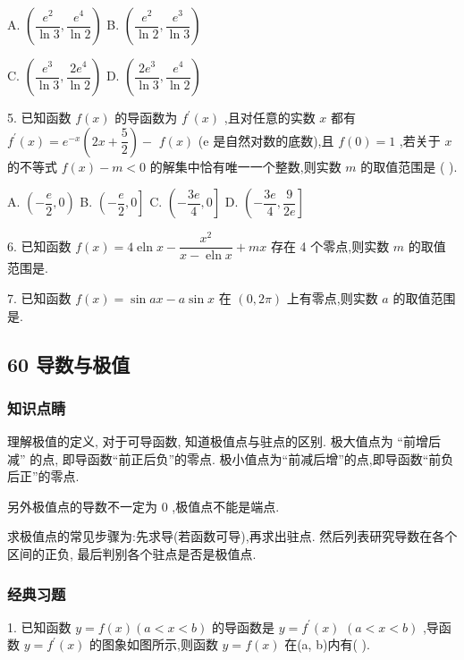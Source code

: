 A. $\left( {\dfrac{{{e}}^{2}}{\ln 3},\dfrac{{{e}}^{4}}{\ln 2}}\right)$ B. $\left( {\dfrac{{{e}}^{2}}{\ln 2},\dfrac{{{e}}^{3}}{\ln 3}}\right)$

C. $\left( {\dfrac{{{e}}^{3}}{\ln 3},\dfrac{2{{e}}^{4}}{\ln 2}}\right)$ D. $\left( {\dfrac{2{{e}}^{3}}{\ln 3},\dfrac{{{e}}^{4}}{\ln 2}}\right)$

5. 已知函数 $f\left( x\right)$ 的导函数为 ${f}^{\prime }\left( x\right)$ ,且对任意的实数 $x$ 都有 ${f}^{\prime }\left( x\right)  = {{e}}^{-x}\left( {{2x} + \dfrac{5}{2}}\right)  -$  $f\left( x\right)$ (e 是自然对数的底数),且 $f\left( 0\right)  = 1$ ,若关于 $x$ 的不等式 $f\left( x\right)  - m < 0$ 的解集中恰有唯一一个整数,则实数 $m$ 的取值范围是 (   ).

A. $\left( {-\dfrac{{e}}{2},0}\right)$ B. $\left( {-\dfrac{{e}}{2},0}\right\rbrack$ C. $\left( {-\dfrac{3{e}}{4},0}\right\rbrack$ D. $\left( {-\dfrac{3{e}}{4},\dfrac{9}{2{e}}}\right\rbrack$

6. 已知函数 $f\left( x\right)  = 4\operatorname{eln}x - \dfrac{{x}^{2}}{x - \operatorname{eln}x} + {mx}$ 存在 4 个零点,则实数 $m$ 的取值范围是\blkda{}.

7. 已知函数 $f\left( x\right)  = \sin {ax} - a\sin x$ 在 $\left( {0,{2\pi }}\right)$ 上有零点,则实数 $a$ 的取值范围是\blkda{}.

\subsection*{60 导数与极值}

\subsubsection*{知识点睛}

理解极值的定义, 对于可导函数, 知道极值点与驻点的区别. 极大值点为 “前增后减” 的点, 即导函数“前正后负”的零点. 极小值点为“前减后增”的点,即导函数“前负后正”的零点.

另外极值点的导数不一定为 0 ,极值点不能是端点.

求极值点的常见步骤为:先求导(若函数可导),再求出驻点. 然后列表研究导数在各个区间的正负, 最后判别各个驻点是否是极值点.

\subsubsection*{经典习题}

1. 已知函数 $y = f\left( x\right) \left( {a < x < b}\right)$ 的导函数是 $y = {f}^{\prime }\left( x\right)$  $\left( {a < x < b}\right)$ ,导函数 $y = {f}^{\prime }\left( x\right)$ 的图象如图所示,则函数 $y = f\left( x\right)$ 在(a, b)内有(   ).

